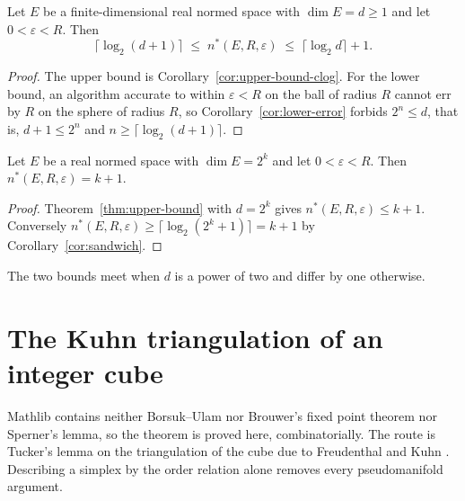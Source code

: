 \begin{corollary}
\label{cor:sandwich}
\leanok
{}
Let $E$ be a finite-dimensional real normed space with $\dim E = d \ge 1$ and let
$0 < \varepsilon < R$. Then
\[
  \lceil \log_2 (d+1) \rceil \;\le\; n^*(E, R, \varepsilon)
  \;\le\; \lceil \log_2 d \rceil + 1 .
\]
\end{corollary}
\begin{proof}
\leanok
{}
The upper bound is Corollary~\ref{cor:upper-bound-clog}. For the lower bound, an algorithm
accurate to within $\varepsilon < R$ on the ball of radius $R$ cannot err by $R$ on the
sphere of radius $R$, so Corollary~\ref{cor:lower-error} forbids
$2^{n} \le d$, that is, $d + 1 \le 2^n$ and $n \ge \lceil \log_2 (d+1) \rceil$.
\end{proof}

\begin{corollary}
\label{cor:power-of-two}
\leanok
{}
Let $E$ be a real normed space with $\dim E = 2^k$ and let $0 < \varepsilon < R$. Then
$n^*(E, R, \varepsilon) = k + 1$.
\end{corollary}
\begin{proof}
\leanok
{}
Theorem~\ref{thm:upper-bound} with $d = 2^k$ gives $n^*(E, R, \varepsilon) \le k + 1$.
Conversely $n^*(E, R, \varepsilon) \ge \lceil \log_2 (2^k + 1) \rceil = k + 1$ by
Corollary~\ref{cor:sandwich}.
\end{proof}

The two bounds meet when $d$ is a power of two and differ by one otherwise.

\appendix

\chapter{The Kuhn triangulation of an integer cube}
\label{ch:grid}

Mathlib contains neither Borsuk--Ulam nor Brouwer's fixed point theorem nor Sperner's
lemma, so the theorem is proved here, combinatorially. The route is Tucker's lemma
\cite{Tucker46} on the triangulation of the cube due to Freudenthal \cite{Freudenthal42}
and Kuhn \cite{Kuhn60}. Describing a simplex by the order relation alone removes every
pseudomanifold argument.

